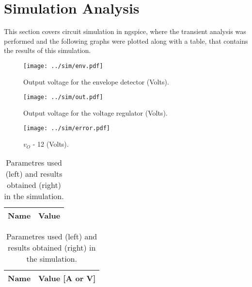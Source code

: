\newpage
\section{Simulation Analysis}
\label{sec:simulation}
This section covers circuit simulation in ngspice, where the transient analysis was performed and the following graphs were plotted along with a table, 
that contains the results of this simulation.
\newpage
\begin{figure}[h!] \centering
\texttt{[image: ../sim/env.pdf]}
\caption{Output voltage for the envelope detector (Volts).}
\label{fig:envelope}
\end{figure}

\begin{figure}[h!] \centering
\texttt{[image: ../sim/out.pdf]}
\caption{Output voltage for the voltage regulator (Volts).}
\label{fig:regulator}
\end{figure}

\begin{figure}[h!] \centering
\texttt{[image: ../sim/error.pdf]}
\caption{$v_O$ - 12 (Volts).}
\label{fig: vo - 12}
\end{figure}

\begin{table}[h!]
  \centering
  \begin{tabular}{|c|c|}
    \hline    
    {\bf Name} & {\bf Value} \\ \hline
    
  \end{tabular}
 \begin{tabular}{|c|c|}
 \hline
 \centering
    {\bf Name} & {\bf Value [A or V]} \\ 
    \hline
    
\hline
 \end{tabular}
 \caption{Parametres used (left) and results obtained (right) in the simulation.}
  \label{tab:optabs}
\end{table}




